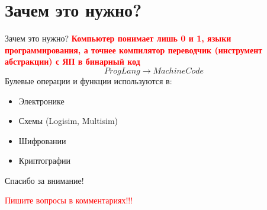 \documentclass{beamer}
\begin{document}
\section{Зачем это нужно?}
\begin{frame}{Зачем это нужно?}
    \textbf{\textcolor{red}{Компьютер понимает лишь 0 и 1, языки программирования, а точнее компилятор переводчик (инструмент абстракции) с ЯП в бинарный код}}
    \[ ProgLang \rightarrow MachineCode \]
    Булевые операции и функции используются в:
    \begin{itemize}
        \item Электронике
        \item Схемы (Logisim, Multisim)
        \item Шифровании 
        \item Криптографии
    \end{itemize}
\end{frame}
\begin{frame}{}
    \centering
    \Large Спасибо за внимание!
    
    \vspace{1cm}
    \small \textcolor{red}{Пишите вопросы в комментариях!!!}
\end{frame}
\end{document}
